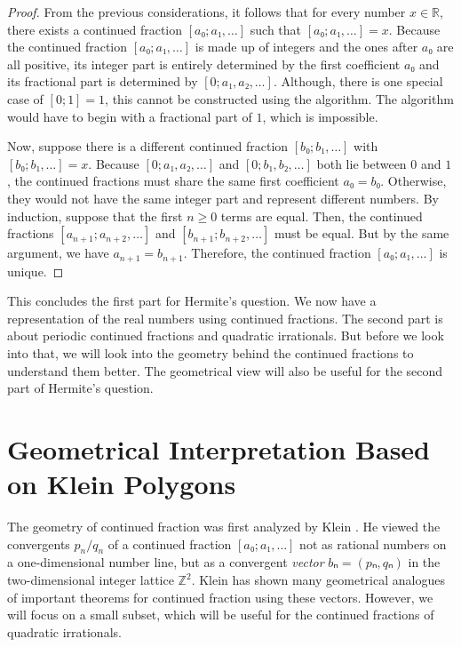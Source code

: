 \begin{proof}
  From the previous considerations, it follows that for every number $x ∈ ℝ$,
  there exists a continued fraction $[a₀; a₁, …]$ such that $[a₀; a₁, …] = x$.
  Because the continued fraction $[a₀; a₁, …]$ is made up of integers and the
  ones after $a₀$ are all positive, its integer part is entirely determined by
  the first coefficient $a₀$ and its fractional part is determined by $[0; a₁, a₂, …]$.
  Although, there is one special case of $[0; 1] = 1$,
  this cannot be constructed using the algorithm.
  The algorithm would have to begin with a fractional part of $1$, which is impossible.

  Now, suppose there is a different continued fraction $[b₀; b₁, …]$ with $[b₀; b₁, …] = x$.
  Because $[0; a₁, a₂, …]$ and $[0; b₁, b₂, …]$ both lie between $0$ and $1$,
  the continued fractions must share the same first coefficient $a₀ = b₀$.
  Otherwise, they would not have the same integer part and represent different numbers.
  By induction, suppose that the first $n ≥ 0$ terms are equal.
  Then, the continued fractions $[a_{n+1}; a_{n+2}, …]$ and $[b_{n+1}; b_{n+2}, …]$ must be equal.
  But by the same argument, we have $a_{n+1} = b_{n+1}$.
  Therefore, the continued fraction $[a₀; a₁, …]$ is unique.
\end{proof}

This concludes the first part for Hermite's question.
We now have a representation of the real numbers using continued fractions.
The second part is about periodic continued fractions and quadratic irrationals.
But before we look into that, we will look into the geometry behind the continued fractions
to understand them better.
The geometrical view will also be useful for the second part of Hermite's question.

\section{Geometrical Interpretation Based on Klein Polygons}
\label{sec:cf-geometry}

The geometry of continued fraction was first analyzed by Klein \cite{Klein95}.
He viewed the convergents $p_n/q_n$ of a continued fraction $[a₀; a₁, …]$ not
as rational numbers on a one-dimensional number line,
but as a convergent \emph{vector} $bₙ = (pₙ, qₙ)$ in the two-dimensional integer lattice $ℤ^2$.
Klein has shown many geometrical analogues of important theorems for continued fraction
using these vectors.
However, we will focus on a small subset, which will be useful for the
continued fractions of quadratic irrationals.

